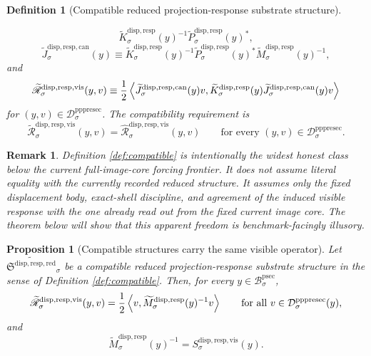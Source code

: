 \documentclass[11pt]{article}
\newcommand{\ProtoSectionBody}[1]{\mathcal B_{#1}^{\mathrm{psec}}}
\newcommand{\PrePreProtoSectionResidualBody}[1]{\mathcal D_{#1}^{\mathrm{pppresec}}}
\newcommand{\ReducedStructure}{\mathfrak S^{\mathrm{disp,resp,red}}}
\newcommand{\CoreForcedBodyResponse}[1]{\widehat{\mathscr R}_{#1}^{\mathrm{disp,resp,vis}}}
\newcommand{\VisibleResponseOperator}[1]{S_{#1}^{\mathrm{disp,resp,vis}}}
\newcommand{\CompatibleProjection}[1]{\widetilde P_{#1}^{\mathrm{disp,resp}}}
\newcommand{\CompatibleOperator}[1]{\widetilde K_{#1}^{\mathrm{disp,resp}}}
\newcommand{\CompatibleSchur}[1]{\widetilde M_{#1}^{\mathrm{disp,resp}}}
\newcommand{\CompatibleLift}[1]{\widetilde J_{#1}^{\mathrm{disp,resp,can}}}
\newcommand{\CompatibleResponse}[1]{\widetilde{\mathscr R}_{#1}^{\mathrm{disp,resp,vis}}}
\newtheorem{definition}{Definition}
\newtheorem{proposition}{Proposition}
\newtheorem{remark}{Remark}
\begin{document}
\begin{definition}[Compatible reduced projection-response substrate structure]
\begin{enumerate}
\begin{equation}
    \CompatibleOperator{\sigma}(y)^{-1}
    \CompatibleProjection{\sigma}(y)^*,
    \label{eq:schur}
    \end{equation}
    \begin{equation}
    \CompatibleLift{\sigma}(y)
    \equiv
    \CompatibleOperator{\sigma}(y)^{-1}
    \CompatibleProjection{\sigma}(y)^*
    \CompatibleSchur{\sigma}(y)^{-1},
    \label{eq:complift}
    \end{equation}
    and
    \begin{equation}
    \CompatibleResponse{\sigma}(y,v)
    \equiv
    \frac{1}{2}
    \ev{
    \CompatibleLift{\sigma}(y)v,
    \CompatibleOperator{\sigma}(y)\CompatibleLift{\sigma}(y)v
    }
    \label{eq:compresponse}
    \end{equation}
    for \((y,v)\in\PrePreProtoSectionResidualBody{\sigma}\). The compatibility requirement is
    \begin{equation}
    \CompatibleResponse{\sigma}(y,v)
    =
    \CoreForcedBodyResponse{\sigma}(y,v)
    \qquad
    \text{for every }
    (y,v)\in\PrePreProtoSectionResidualBody{\sigma}.
    \label{eq:compatibility}
    \end{equation}
\end{enumerate}
\end{definition}

\begin{remark}
Definition \ref{def:compatible} is intentionally the widest honest class below the current full-image-core forcing frontier. It does not assume literal equality with the currently recorded reduced structure. It assumes only the fixed displacement body, exact-shell discipline, and agreement of the induced visible response with the one already read out from the fixed current image core. The theorem below will show that this apparent freedom is benchmark-facingly illusory.
\end{remark}

\begin{proposition}[Compatible structures carry the same visible operator]
\label{prop:samevisible}
Let \(\widetilde{\ReducedStructure}_{\sigma}\) be a compatible reduced projection-response substrate structure in the sense of Definition \ref{def:compatible}. Then, for every \(y\in\ProtoSectionBody{\sigma}\),
\begin{equation}
\CompatibleResponse{\sigma}(y,v)
=
\frac{1}{2}
\ev{v,\CompatibleSchur{\sigma}(y)^{-1}v}
\qquad
\text{for all }
v\in\PrePreProtoSectionResidualBody{\sigma}(y),
\label{eq:schurresp}
\end{equation}
and
\begin{equation}
\CompatibleSchur{\sigma}(y)^{-1}
=
\VisibleResponseOperator{\sigma}(y).
\label{eq:samevisible}
\end{equation}
\end{proposition}
\end{document}
